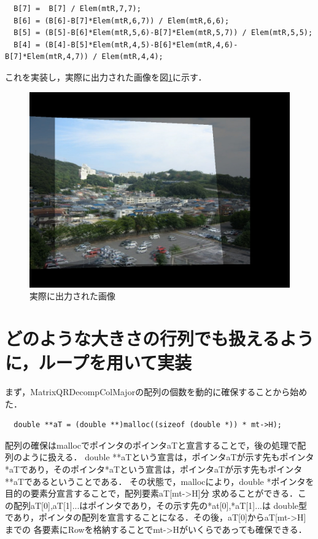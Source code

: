 \documentclass[11pt]{jarticle}
\begin{document}
\begin{verbatim}
  B[7] =  B[7] / Elem(mtR,7,7);
  B[6] = (B[6]-B[7]*Elem(mtR,6,7)) / Elem(mtR,6,6);
  B[5] = (B[5]-B[6]*Elem(mtR,5,6)-B[7]*Elem(mtR,5,7)) / Elem(mtR,5,5);
  B[4] = (B[4]-B[5]*Elem(mtR,4,5)-B[6]*Elem(mtR,4,6)-B[7]*Elem(mtR,4,7)) / Elem(mtR,4,4);
\end{verbatim}

これを実装し，実際に出力された画像を図\ref{syuturyoku}に示す．

\begin{figure}[ht]
  \centering
  \includegraphics[scale=.2]{syuturyoku.jpg}
  \caption{実際に出力された画像}
  \label{syuturyoku}
\end{figure}

\section{どのような大きさの行列でも扱えるように，ループを用いて実装}

まず，MatrixQRDecompColMajorの配列の個数を動的に確保することから始めた．
\begin{verbatim}
  double **aT = (double **)malloc((sizeof (double *)) * mt->H);
\end{verbatim}
配列の確保はmallocでポインタのポインタaTと宣言することで，後の処理で配列のように扱える．
double **aTという宣言は，ポインタaTが示す先もポインタ*aTであり，そのポインタ*aTという宣言は，ポインタaTが示す先もポインタ
**aTであるということである．
その状態で，mallocにより，double *ポインタを目的の要素分宣言することで，配列要素aT[mt->H]分
求めることができる．この配列aT[0],aT[1]...はポインタであり，その示す先の*at[0],*aT[1]...は
double型であり，ポインタの配列を宣言することになる．その後，aT[0]からaT[mt->H]までの
各要素にRowを格納することでmt->Hがいくらであっても確保できる．
\end{document}

